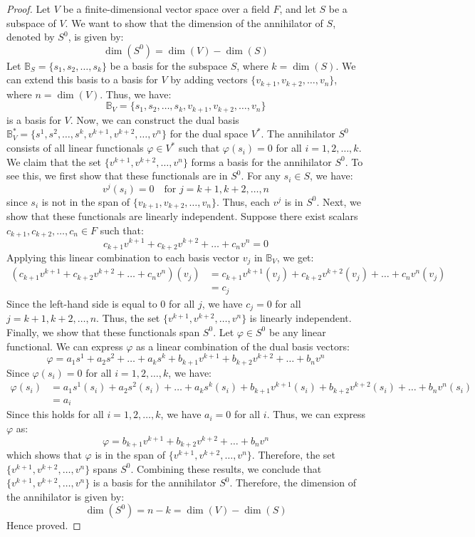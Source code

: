 \documentclass[openany]{book}
\begin{document}
\begin{proof}
    Let $V$ be a finite-dimensional vector space over a field $F$, and let $S$ be a subspace of $V$. We want to show that the dimension of the annihilator of $S$, denoted by $S^0$, is given by:
    $$\dim(S^0) = \dim(V) - \dim(S)$$
    Let $\mathbb{B}_S = \{s_1, s_2, \ldots, s_k\}$ be a basis for the subspace $S$, where $k = \dim(S)$. We can extend this basis to a basis for $V$ by adding vectors $\{v_{k+1}, v_{k+2}, \ldots, v_n\}$, where $n = \dim(V)$. Thus, we have:
    $$\mathbb{B}_V = \{s_1, s_2, \ldots, s_k, v_{k+1}, v_{k+2}, \ldots, v_n\}$$
    is a basis for $V$. Now, we can construct the dual basis $\mathbb{B}_V^* = \{s^1, s^2, \ldots, s^k, v^{k+1}, v^{k+2}, \ldots, v^n\}$ for the dual space $V^*$. The annihilator $S^0$ consists of all linear functionals $\varphi \in V^*$ such that $\varphi(s_i) = 0$ for all $i = 1, 2, \ldots, k$.
    We claim that the set $\{v^{k+1}, v^{k+2}, \ldots, v^n\}$ forms a basis for the annihilator $S^0$. To see this, we first show that these functionals are in $S^0$. For any $s_i \in S$, we have:
    $$v^{j}(s_i) = 0 \quad \text{for }j = k+1, k+2, \ldots, n$$
    since $s_i$ is not in the span of $\{v_{k+1}, v_{k+2}, \ldots, v_n\}$. Thus, each $v^{j}$ is in $S^0$. Next, we show that these functionals are linearly independent. Suppose there exist scalars $c_{k+1}, c_{k+2}, \ldots, c_n \in F$ such that:
    $$c_{k+1} v^{k+1} + c_{k+2} v^{k+2} + \ldots + c_n v^n = 0$$
    Applying this linear combination to each basis vector $v_j$ in $\mathbb{B}_V$, we get:
    \[\begin{aligned}
    (c_{k+1} v^{k+1} + c_{k+2} v^{k+2} + \ldots + c_n v^n)(v_j) &= c_{k+1} v^{k+1}(v_j) + c_{k+2} v^{k+2}(v_j) + \ldots + c_n v^n(v_j) \\
    &= c_j
    \end{aligned}\]
    Since the left-hand side is equal to 0 for all $j$, we have $c_j = 0$ for all $j = k+1, k+2, \ldots, n$. Thus, the set $\{v^{k+1}, v^{k+2}, \ldots, v^n\}$ is linearly independent.
    Finally, we show that these functionals span $S^0$. Let $\varphi \in S^0$ be any linear functional. We can express $\varphi$ as a linear combination of the dual basis vectors:
    $$\varphi = a_1 s^1 + a_2 s^2 + \ldots + a_k s^k + b_{k+1} v^{k+1} + b_{k+2} v^{k+2} + \ldots + b_n v^n$$
    Since $\varphi(s_i) = 0$ for all $i = 1, 2, \ldots, k$, we have:
    \[\begin{aligned}
    \varphi(s_i) &= a_1 s^1(s_i) + a_2 s^2(s_i) + \ldots + a_k s^k(s_i) + b_{k+1} v^{k+1}(s_i) + b_{k+2} v^{k+2}(s_i) + \ldots + b_n v^n(s_i) \\
    &= a_i
    \end{aligned}\]
    Since this holds for all $i = 1, 2, \ldots, k$, we have $a_i = 0$ for all $i$. Thus, we can express $\varphi$ as:
    $$\varphi = b_{k+1} v^{k+1} + b_{k+2} v^{k+2} + \ldots + b_n v^n$$
    which shows that $\varphi$ is in the span of $\{v^{k+1}, v^{k+2}, \ldots, v^n\}$. Therefore, the set $\{v^{k+1}, v^{k+2}, \ldots, v^n\}$ spans $S^0$.
Combining these results, we conclude that $\{v^{k+1}, v^{k+2}, \ldots, v^n\}$ is a basis for the annihilator $S^0$. Therefore, the dimension of the annihilator is given by:
$$\dim(S^0) = n - k = \dim(V) - \dim(S)$$ 
Hence proved.
\end{proof}
\end{document}
